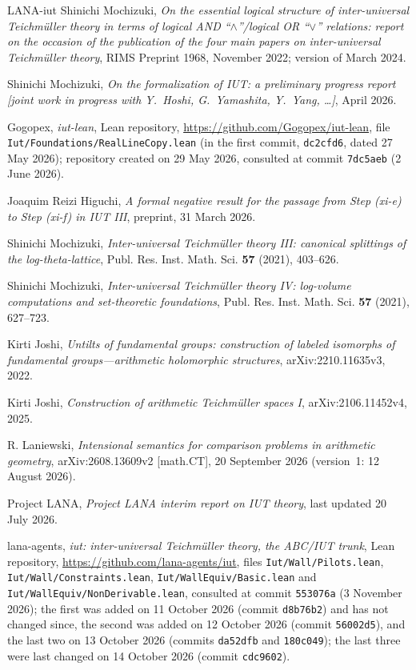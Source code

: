 \documentclass[11pt,a4paper]{article}
\theoremstyle{plain}
\theoremstyle{definition}
\theoremstyle{remark}
\begin{document}
\begin{thebibliography}{LANA-iut}
Shinichi Mochizuki, \emph{On the essential logical structure of inter-universal {T}eichm\"uller theory in terms of
logical {AND} ``$\wedge$''/logical {OR} ``$\vee$'' relations: report on the occasion of the publication of the four main
papers on inter-universal {T}eichm\"uller theory}, RIMS Preprint 1968, November 2022; version of March 2024.

Shinichi Mochizuki, \emph{On the formalization of {IUT}: a preliminary progress report [joint work in progress with
{Y.~Hoshi}, {G.~Yamashita}, {Y.~Yang}, \dots]}, April 2026.

Gogopex, \emph{iut-lean}, Lean repository, \url{https://github.com/Gogopex/iut-lean}, file
\texttt{Iut/Foundations/RealLineCopy.lean} (in the first commit, \texttt{dc2cfd6}, dated 27 May 2026); repository
created on 29 May 2026, consulted at commit \texttt{7dc5aeb} (2 June 2026).

Joaquim Reizi Higuchi, \emph{A formal negative result for the passage from {S}tep (xi-e) to {S}tep (xi-f) in {IUT}
{III}}, preprint, 31 March 2026.

Shinichi Mochizuki, \emph{Inter-universal {T}eichm\"uller theory {III}: canonical splittings of the log-theta-lattice},
Publ. Res. Inst. Math. Sci. \textbf{57} (2021), 403--626.

Shinichi Mochizuki, \emph{Inter-universal {T}eichm\"uller theory {IV}: log-volume computations and set-theoretic
foundations}, Publ. Res. Inst. Math. Sci. \textbf{57} (2021), 627--723.

Kirti Joshi, \emph{Untilts of fundamental groups: construction of labeled isomorphs of fundamental groups---arithmetic
holomorphic structures}, arXiv:2210.11635v3, 2022.

Kirti Joshi, \emph{Construction of arithmetic {T}eichm\"uller spaces {I}}, arXiv:2106.11452v4, 2025.

R. Laniewski, \emph{Intensional semantics for comparison problems in arithmetic geometry}, arXiv:2608.13609v2
[math.CT], 20 September 2026 (version~1: 12 August 2026).

Project LANA, \emph{Project LANA interim report on IUT theory}, last updated 20 July 2026.

lana-agents, \emph{iut: inter-universal {T}eichm\"uller theory, the ABC/IUT trunk}, Lean repository,
\url{https://github.com/lana-agents/iut}, files \texttt{Iut/Wall/Pilots.lean}, \texttt{Iut/Wall/Constraints.lean},
\texttt{Iut/WallEquiv/Basic.lean} and \texttt{Iut/WallEquiv/NonDerivable.lean}, consulted at commit \texttt{553076a}
(3 November 2026); the first was added on 11 October 2026 (commit \texttt{d8b76b2}) and has not changed since, the
second was added on 12 October 2026 (commit \texttt{56002d5}), and the last two on 13 October 2026 (commits
\texttt{da52dfb} and \texttt{180c049}); the last three were last changed on 14 October 2026 (commit \texttt{cdc9602}).


\end{thebibliography}
\end{document}
